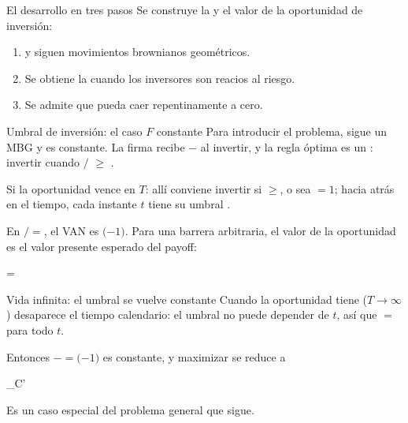 \begin{frame}{El desarrollo en tres pasos}
  Se construye la  y el valor de la
  oportunidad de inversión:
  \par\vspace{3mm}
  \begin{enumerate}
    \item {} y  siguen movimientos brownianos geométricos.
    \item Se obtiene la  cuando los
          inversores son reacios al riesgo.
    \item Se admite que  pueda caer repentinamente a cero.
  \end{enumerate}
\end{frame}

\begin{frame}{Umbral de inversión: el caso $F$ constante}
  Para introducir el problema,  sigue un MBG y  es
  constante. La firma recibe $-$ al invertir, y la regla
  óptima es un : invertir cuando
  $/$ $\geq$ .
  \par\vspace{2.5mm}
  Si la oportunidad vence en $T$: allí conviene invertir si
  $\geq$, o sea $=1$; hacia atrás en el tiempo,
  cada instante $t$ tiene su umbral .
  \par\vspace{2.5mm}
  En $/$$=$, el VAN es
  $($$-1)$. Para una barrera arbitraria, el valor de la
  oportunidad es el valor presente esperado del payoff:
  \begin{ecmed}
     = 
  \end{ecmed}
\end{frame}

\begin{frame}{Vida infinita: el umbral se vuelve constante}
  Cuando la oportunidad tiene  ($T\to\infty$)
  desaparece el tiempo calendario: el umbral no puede depender de $t$, así
  que $=$ para todo $t$.
  \par\vspace{4mm}
  Entonces $-$$=$$($$-1)$ es constante,
  y maximizar  se reduce a
  \begin{ec}
    \max_{C'}\; 
  \end{ec}
  Es un caso especial del problema general que sigue.
\end{frame}

